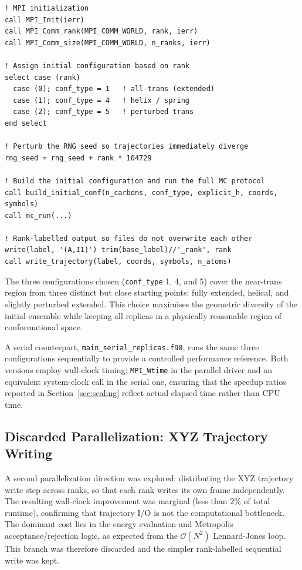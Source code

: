 \documentclass[11pt, a4paper]{article}
\begin{document}
\begin{lstlisting}[caption={Rank-dependent configuration and seed assignment.}]
! MPI initialization
call MPI_Init(ierr)
call MPI_Comm_rank(MPI_COMM_WORLD, rank, ierr)
call MPI_Comm_size(MPI_COMM_WORLD, n_ranks, ierr)

! Assign initial configuration based on rank
select case (rank)
  case (0); conf_type = 1   ! all-trans (extended)
  case (1); conf_type = 4   ! helix / spring
  case (2); conf_type = 5   ! perturbed trans
end select

! Perturb the RNG seed so trajectories immediately diverge
rng_seed = rng_seed + rank * 104729

! Build the initial configuration and run the full MC protocol
call build_initial_conf(n_carbons, conf_type, explicit_h, coords, symbols)
call mc_run(...)

! Rank-labelled output so files do not overwrite each other
write(label, '(A,I1)') trim(base_label)//'_rank', rank
call write_trajectory(label, coords, symbols, n_atoms)
\end{lstlisting}

The three configurations chosen (\texttt{conf\_type} 1, 4, and 5) cover the
near-trans region from three distinct but close starting points: fully
extended, helical, and slightly perturbed extended. This choice maximises the
geometric diversity of the initial ensemble while keeping all replicas in
a physically reasonable region of conformational space.

A serial counterpart, \texttt{main\_serial\_replicas.f90}, runs the same
three configurations sequentially to provide a controlled performance
reference. Both versions employ wall-clock timing: \texttt{MPI\_Wtime} in the
parallel driver and an equivalent system-clock call in the serial one,
ensuring that the speedup ratios reported in Section~\ref{sec:scaling} reflect
actual elapsed time rather than CPU time.

\subsection{Discarded Parallelization: XYZ Trajectory Writing}

A second parallelization direction was explored: distributing the XYZ
trajectory write step across ranks, so that each rank writes its own frame
independently. The resulting wall-clock improvement was marginal (less than
2\% of total runtime), confirming that trajectory I/O is not the computational
bottleneck. The dominant cost lies in the energy evaluation and
Metropolis acceptance/rejection logic, as expected from the
$\mathcal{O}(N^2)$ Lennard-Jones loop. This branch was therefore discarded
and the simpler rank-labelled sequential write was kept.
\end{document}
